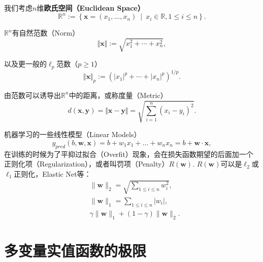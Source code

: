\begin{frame}

我们考虑$n$维{\bfseries 欧氏空间（Euclidean Space）}
\[\mathbb{R}^n := \left\{ \mathbf{x} = (x_1,\ldots,x_n) \ \middle\vert \ x_i\in\mathbb{R}, 1\leqslant i \leqslant n \right\}.\]

\pause



$\mathbb{R}^n$有自然范数（Norm）
\[\Vert \mathbf{x} \Vert := \sqrt{x_1^2 + \cdots + x_n^2},\]

\pause

以及更一般的$\ell_p$范数（$p\geqslant1$）
\[\Vert \mathbf{x} \Vert_p := \left(|x_1|^p + \cdots + |x_n|^p\right)^{1/p}.\]

\pause

由范数可以诱导出$\mathbb{R}^n$中的距离，或称度量（Metric）
\[d(\mathbf{x}, \mathbf{y}) = \Vert \mathbf{x} - \mathbf{y} \Vert = \sqrt{\sum\limits_{i=1}^n (x_i-y_i)^2}.\]

\end{frame}


\begin{frame}

机器学习的一些线性模型（Linear Models）
\[\label{linear model}
y_{pred}(b,\mathbf{w},\mathbf{x}) = b + w_1x_1 + \ldots + w_nx_n = b + \mathbf{w}\cdot\mathbf{x},\]
在训练的时候为了平抑过拟合（Overfit）现象，会在损失函数期望的后面加一个正则化项（Regularization），或者叫罚项（Penalty）$R(\mathbf{w})$. $R(\mathbf{w})$可以是$\ell_2$或$\ell_1$正则化，Elastic Net等：
\begin{align*}
& \lVert\mathbf{w}\rVert_2 = \sqrt{\sum\limits_{1 \leqslant i \leqslant n} w_i^2}, \\
& \lVert\mathbf{w}\rVert_1 = \sum\limits_{1 \leqslant i \leqslant n} \lvert w_i\rvert, \\
& \gamma \lVert\mathbf{w}\rVert_1 + (1-\gamma) \lVert\mathbf{w}\rVert_2.
\end{align*}

\end{frame}


\section{多变量实值函数的极限}

